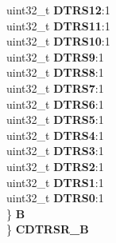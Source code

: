 \begin{DoxyCompactItemize}
\begin{tabbing}
\>\>uint32\_t {\bfseries DTRS12}:1\\
\>\>uint32\_t {\bfseries DTRS11}:1\\
\>\>uint32\_t {\bfseries DTRS10}:1\\
\>\>uint32\_t {\bfseries DTRS9}:1\\
\>\>uint32\_t {\bfseries DTRS8}:1\\
\>\>uint32\_t {\bfseries DTRS7}:1\\
\>\>uint32\_t {\bfseries DTRS6}:1\\
\>\>uint32\_t {\bfseries DTRS5}:1\\
\>\>uint32\_t {\bfseries DTRS4}:1\\
\>\>uint32\_t {\bfseries DTRS3}:1\\
\>\>uint32\_t {\bfseries DTRS2}:1\\
\>\>uint32\_t {\bfseries DTRS1}:1\\
\>\>uint32\_t {\bfseries DTRS0}:1\\
\>\} {\bfseries B}\\
\} {\bfseries CDTRSR\_B}\\


\end{tabbing}
\end{DoxyCompactItemize}
